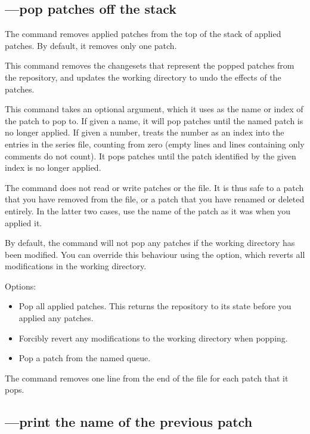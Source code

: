 \subsection{---pop patches off the stack}

The  command removes applied patches from the top of the
stack of applied patches.  By default, it removes only one patch.

This command removes the changesets that represent the popped patches
from the repository, and updates the working directory to undo the
effects of the patches.

This command takes an optional argument, which it uses as the name or
index of the patch to pop to.  If given a name, it will pop patches
until the named patch is no longer applied.  If given a number,
 treats the number as an index into the entries in the
series file, counting from zero (empty lines and lines containing only
comments do not count).  It pops patches until the patch identified by
the given index is no longer applied.

The  command does not read or write patches or the
 file.  It is thus safe to  a patch that
you have removed from the  file, or a patch that you
have renamed or deleted entirely.  In the latter two cases, use the
name of the patch as it was when you applied it.

By default, the  command will not pop any patches if the
working directory has been modified.  You can override this behaviour
using the  option, which reverts all modifications in
the working directory.

Options:
\begin{itemize}
\item[\hgopt{qpop}{-a}] Pop all applied patches.  This returns the
  repository to its state before you applied any patches.
\item[\hgopt{qpop}{-f}] Forcibly revert any modifications to the
  working directory when popping.
\item[\hgopt{qpop}{-n}] Pop a patch from the named queue.
\end{itemize}

The  command removes one line from the end of the
 file for each patch that it pops.
\subsection{---print the name of the previous patch}

